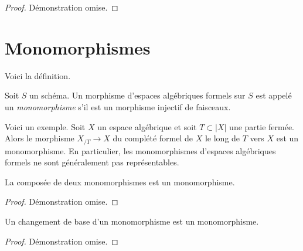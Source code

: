 \begin{proof}
Démonstration omise.
\end{proof}







\section{Monomorphismes}
\label{section-monomorphisms}

\noindent
Voici la définition.

\begin{definition}
\label{definition-monomorphism}
Soit $S$ un schéma.
Un morphisme d'espaces algébriques formels sur $S$ est appelé un
{\it monomorphisme} s'il est un morphisme injectif de faisceaux.
\end{definition}

\noindent
Voici un exemple. Soit $X$ un espace algébrique et soit
$T \subset |X|$ une partie fermée. Alors le morphisme
$X_{/T} \to X$ du complété formel de $X$ le long de $T$ vers $X$
est un monomorphisme. En particulier, les monomorphismes d'espaces algébriques
formels ne sont généralement pas représentables.

\begin{lemma}
\label{lemma-composition-monomorphism}
La composée de deux monomorphismes est un monomorphisme.
\end{lemma}

\begin{proof}
Démonstration omise.
\end{proof}

\begin{lemma}
\label{lemma-base-change-monomorphism}
Un changement de base d'un monomorphisme est un monomorphisme.
\end{lemma}

\begin{proof}
Démonstration omise.
\end{proof}

